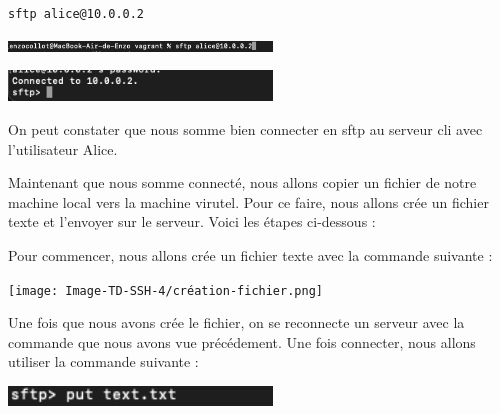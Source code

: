 \documentclass[12pt]{article}
\begin{document}
\texttt{sftp alice@10.0.0.2}

\vspace{0.3cm}

\begin{center}
  \includegraphics[width=7cm]{Image-TD-SSH-4/commande-sftp.png}
\end{center}

\vspace{0.3cm}

\begin{center}
  \includegraphics[width=7cm]{Image-TD-SSH-4/connexion-sftp.png}
\end{center}

\vspace{0.3cm}

On peut constater que nous somme bien connecter en sftp au serveur cli avec l'utilisateur Alice.

\vspace{0.3cm}

Maintenant que nous somme connecté, nous allons copier un fichier de notre machine local vers la machine virutel. Pour ce faire, nous allons crée un fichier texte et l'envoyer sur le serveur. Voici les étapes ci-dessous : 

\vspace{0.3cm}

Pour commencer, nous allons crée un fichier texte avec la commande suivante  : 

\vspace{0.3cm}

\begin{center}
  \texttt{[image: Image-TD-SSH-4/création-fichier.png]}
\end{center}

\vspace{0.3cm}

Une fois que nous avons crée le fichier, on se reconnecte un serveur avec la commande que nous avons vue précédement. Une fois connecter, nous allons utiliser la commande suivante : 

\vspace{0.3cm}

\begin{center}
  \includegraphics[width=7cm]{Image-TD-SSH-4/fichier-envoyer.png}
\end{center}
\end{document}
